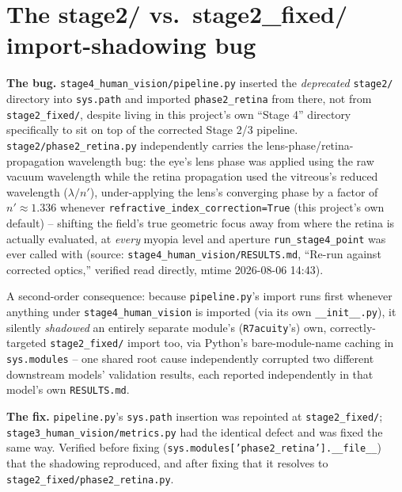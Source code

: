 \section{The stage2/ vs.\ stage2\_fixed/ import-shadowing bug}
\label{sec:bug-shadowing}
\textbf{The bug.} \texttt{stage4\_human\_vision/pipeline.py} inserted the
\emph{deprecated} \texttt{stage2/} directory into \texttt{sys.path} and imported
\texttt{phase2\_retina} from there, not from \texttt{stage2\_fixed/}, despite living in
this project's own ``Stage 4'' directory specifically to sit on top of the corrected
Stage 2/3 pipeline. \texttt{stage2/phase2\_retina.py} independently carries the
lens-phase/retina-propagation wavelength bug: the eye's lens phase was applied using
the raw vacuum wavelength while the retina propagation used the vitreous's reduced
wavelength ($\lambda/n'$), under-applying the lens's converging phase by a factor of
$n'\approx1.336$ whenever \texttt{refractive\_index\_correction=True} (this project's
own default) -- shifting the field's true geometric focus away from where the retina is
actually evaluated, at \emph{every} myopia level and aperture \texttt{run\_stage4\_point}
was ever called with (source: \texttt{stage4\_human\_vision/RESULTS.md}, ``Re-run against
corrected optics,'' verified read directly, mtime 2026-08-06 14:43).

A second-order consequence: because \texttt{pipeline.py}'s import runs first whenever
anything under \texttt{stage4\_human\_vision} is imported (via its own
\texttt{\_\_init\_\_.py}), it silently \emph{shadowed} an entirely separate module's
(\texttt{R7acuity}'s) own, correctly-targeted \texttt{stage2\_fixed/} import too, via
Python's bare-module-name caching in \texttt{sys.modules} -- one shared root cause
independently corrupted two different downstream models' validation results, each
reported independently in that model's own \texttt{RESULTS.md}.

\textbf{The fix.} \texttt{pipeline.py}'s \texttt{sys.path} insertion was repointed at
\texttt{stage2\_fixed/}; \texttt{stage3\_human\_vision/metrics.py} had the identical
defect and was fixed the same way. Verified before fixing
(\texttt{sys.modules['phase2\_retina'].\_\_file\_\_}) that the shadowing reproduced, and
after fixing that it resolves to \texttt{stage2\_fixed/phase2\_retina.py}.

